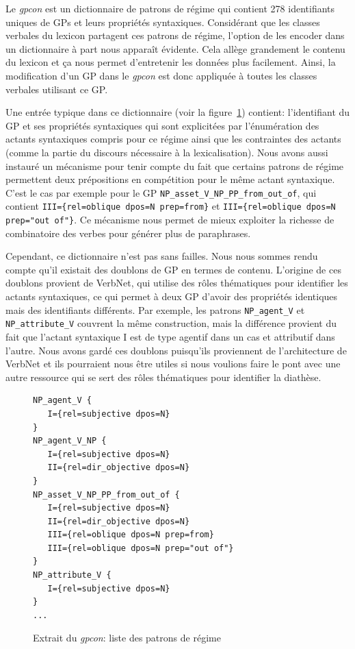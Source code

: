 Le \emph{gpcon} est un dictionnaire de patrons de régime qui contient 278 identifiants uniques de \acp{GP} et leurs propriétés syntaxiques. Considérant que les classes verbales du lexicon partagent ces patrons de régime, l'option de les encoder dans un dictionnaire à part nous apparaît évidente. Cela allège grandement le contenu du lexicon et ça nous permet d'entretenir les données plus facilement. Ainsi, la modification d'un \ac{GP} dans le \emph{gpcon} est donc appliquée à toutes les classes verbales utilisant ce \ac{GP}. 

Une entrée typique dans ce dictionnaire (voir la figure~\ref{fig:4entries-gpcon}) contient: l'identifiant du \ac{GP} et ses propriétés syntaxiques qui sont explicitées par l'énumération des actants syntaxiques compris pour ce régime ainsi que les contraintes des actants (comme la partie du discours nécessaire à la lexicalisation). Nous avons aussi instauré un mécanisme pour tenir compte du fait que certains patrons de régime permettent deux prépositions en compétition pour le même actant syntaxique. C'est le cas par exemple pour le \ac{GP} \texttt{NP\_asset\_V\_NP\_PP\_from\_out\_of}, qui contient \lstinline|III={rel=oblique dpos=N prep=from}| et \lstinline|III={rel=oblique dpos=N prep="out of"}|. Ce mécanisme nous permet de mieux exploiter la richesse de combinatoire des verbes pour générer plus de paraphrases.

Cependant, ce dictionnaire n'est pas sans failles. Nous nous sommes rendu compte qu'il existait des doublons de \ac{GP} en termes de contenu. L'origine de ces doublons provient de VerbNet, qui utilise des rôles thématiques pour identifier les actants syntaxiques, ce qui permet à deux \ac{GP} d'avoir des propriétés identiques mais des identifiants différents. Par exemple, les patrons \texttt{NP\_agent\_V} et \texttt{NP\_attribute\_V} couvrent la même construction, mais la différence provient du fait que l'actant syntaxique I est de type agentif dans un cas et attributif dans l'autre. Nous avons gardé ces doublons puisqu'ils proviennent de l'architecture de VerbNet et ils pourraient nous être utiles si nous voulions faire le pont avec une autre ressource qui se sert des rôles thématiques pour identifier la diathèse.

\begin{figure}[htb]
\begin{lstlisting}[language=mate]
NP_agent_V {
   I={rel=subjective dpos=N}
}
NP_agent_V_NP {
   I={rel=subjective dpos=N}
   II={rel=dir_objective dpos=N}
}
NP_asset_V_NP_PP_from_out_of {
   I={rel=subjective dpos=N}
   II={rel=dir_objective dpos=N}
   III={rel=oblique dpos=N prep=from}
   III={rel=oblique dpos=N prep="out of"}
}
NP_attribute_V {
   I={rel=subjective dpos=N}
}
...
\end{lstlisting}
  \caption{Extrait du \emph{gpcon}: liste des patrons de régime}
	\label{fig:4entries-gpcon}
\end{figure}


